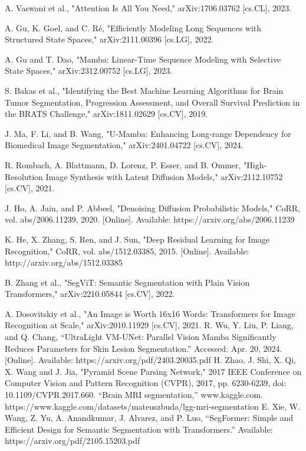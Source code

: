 \documentclass[conference]{IEEEtran}
\begin{document}
\begin{thebibliography}{00}
 A. Vaswani et al., "Attention Is All You Need," arXiv:1706.03762 [cs.CL], 2023.

 A. Gu, K. Goel, and C. Ré, "Efficiently Modeling Long Sequences with Structured State Spaces," arXiv:2111.00396 [cs.LG], 2022.

 A. Gu and T. Dao, "Mamba: Linear-Time Sequence Modeling with Selective State Spaces," arXiv:2312.00752 [cs.LG], 2023.

 S. Bakas et al., "Identifying the Best Machine Learning Algorithms for Brain Tumor Segmentation, Progression Assessment, and Overall Survival Prediction in the BRATS Challenge," arXiv:1811.02629 [cs.CV], 2019.

 J. Ma, F. Li, and B. Wang, "U-Mamba: Enhancing Long-range Dependency for Biomedical Image Segmentation," arXiv:2401.04722 [cs.CV], 2024.

 R. Rombach, A. Blattmann, D. Lorenz, P. Esser, and B. Ommer, "High-Resolution Image Synthesis with Latent Diffusion Models," arXiv:2112.10752 [cs.CV], 2021.

 J. Ho, A. Jain, and P. Abbeel, "Denoising Diffusion Probabilistic Models," CoRR, vol. abs/2006.11239, 2020. [Online]. Available: https://arxiv.org/abs/2006.11239

 K. He, X. Zhang, S. Ren, and J. Sun, "Deep Residual Learning for Image Recognition," CoRR, vol. abs/1512.03385, 2015. [Online]. Available: http://arxiv.org/abs/1512.03385

 B. Zhang et al., "SegViT: Semantic Segmentation with Plain Vision Transformers," arXiv:2210.05844 [cs.CV], 2022.

 A. Dosovitskiy et al., "An Image is Worth 16x16 Words: Transformers for Image Recognition at Scale," arXiv:2010.11929 [cs.CV], 2021.
 R. Wu, Y. Liu, P. Liang, and Q. Chang, “UltraLight VM-UNet: Parallel Vision Mamba Significantly Reduces Parameters for Skin Lesion Segmentation.” Accessed: Apr. 20, 2024. [Online]. Available: https://arxiv.org/pdf/2403.20035.pdf
H. Zhao, J. Shi, X. Qi, X. Wang and J. Jia, "Pyramid Scene Parsing Network," 2017 IEEE Conference on Computer Vision and Pattern Recognition (CVPR), 2017, pp. 6230-6239, doi: 10.1109/CVPR.2017.660.
 “Brain MRI segmentation,” www.kaggle.com. https://www.kaggle.com/datasets/mateuszbuda/lgg-mri-segmentation
 E. Xie, W. Wang, Z. Yu, A. Anandkumar, J. Alvarez, and P. Luo, “SegFormer: Simple and Efficient Design for Semantic Segmentation with Transformers.” Available: https://arxiv.org/pdf/2105.15203.pdf
\end{thebibliography}
\end{document}
